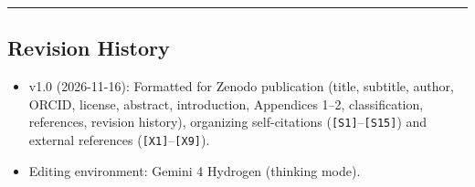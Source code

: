 \documentclass[
  a4paper,
]{article}
\providecommand{\tightlist}{%
  \setlength{\itemsep}{0pt}\setlength{\parskip}{0pt}}
\begin{document}
\begin{center}\rule{0.5\linewidth}{0.5pt}\end{center}

\subsection{Revision History}\label{revision-history}

\begin{itemize}
\tightlist
\item
  v1.0 (2026-11-16): Formatted for Zenodo publication (title, subtitle,
  author, ORCID, license, abstract, introduction, Appendices 1--2,
  classification, references, revision history), organizing
  self-citations (\texttt{{[}S1{]}}--\texttt{{[}S15{]}}) and external
  references (\texttt{{[}X1{]}}--\texttt{{[}X9{]}}).
\item
  Editing environment: Gemini 4 Hydrogen (thinking mode).
\end{itemize}
\end{document}
